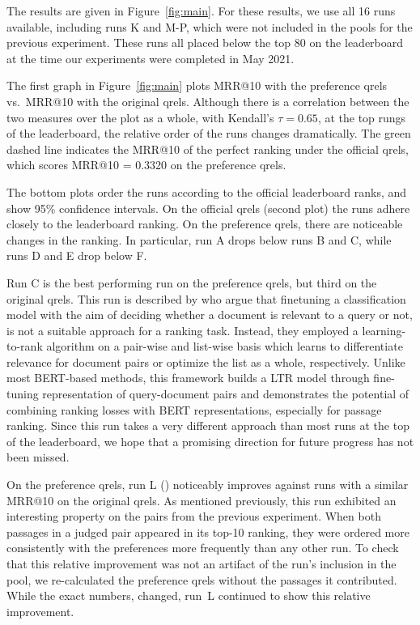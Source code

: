 \documentclass[fullpage]{article}
\begin{document}
The results are given in Figure~\ref{fig:main}.
For these results, we use all 16 runs available, including runs K and M-P, which were not included in the pools for the previous experiment. These runs all placed below the top 80 on the leaderboard at the time our experiments were completed in May 2021.

The first graph in Figure~\ref{fig:main} plots MRR@10 with the preference qrels vs.\ MRR@10 with the original qrels. Although there is a correlation between the two measures over the plot as a whole, with Kendall's $\tau = 0.65$, at the top rungs of the leaderboard, the relative order of the runs changes dramatically. The green dashed line indicates the MRR@10 of the perfect ranking under the official qrels, which scores MRR@10 = 0.3320 on the preference qrels.

The bottom plots order the runs according to the official leaderboard ranks, and show 95\% confidence intervals. On the official qrels (second plot) the runs adhere closely to the leaderboard ranking. On the preference qrels, there are noticeable changes in the ranking. In particular, run A drops below runs B and C, while runs D and E drop below F. %

Run C is the best performing run on the preference qrels, but third on the original qrels. This run is described by \citet{han2020learning} who argue that finetuning a classification model with the aim of deciding whether a document is relevant to a query or not, is not a suitable approach for a ranking task. Instead, they employed a learning-to-rank algorithm on a pair-wise and list-wise basis which learns to differentiate relevance for document pairs or optimize the list as a whole, respectively. Unlike most BERT-based methods, this framework builds a LTR model through fine-tuning representation of query-document pairs and demonstrates the potential of combining ranking losses with BERT representations, especially for passage ranking. Since this run takes a very different approach than most runs at the top of the leaderboard, we hope that a promising direction for future progress has not been missed.

On the preference qrels, run L (\citet{zhan2020repbert}) noticeably improves against runs with a similar MRR@10 on the original qrels. As mentioned previously, this run exhibited an interesting property on the pairs from the previous experiment. When both passages in a judged pair appeared in its top-10 ranking, they were ordered more consistently with the preferences more frequently than any other run. To check that this relative improvement was not an artifact of the run's inclusion in the pool, we re-calculated the preference qrels without the passages it contributed. While the exact numbers, changed, run~L continued to show this relative improvement.
\end{document}
